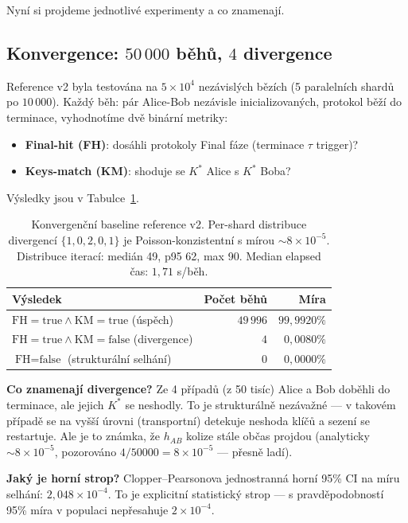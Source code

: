 \documentclass[11pt,a4paper]{article}
\begin{document}
Nyní si projdeme jednotlivé experimenty a co znamenají.

\subsection{Konvergence: $50\,000$ běhů, $4$ divergence}\label{pop:exp-convergence}

Reference v2 byla testována na $5 \times 10^4$ nezávislých bězích (5 paralelních shardů po $10\,000$). Každý běh: pár Alice-Bob nezávisle inicializovaných, protokol běží do terminace, vyhodnotíme dvě binární metriky:
\begin{itemize}[leftmargin=*]
\item \textbf{Final-hit (FH)}: dosáhli protokoly Final fáze (terminace $\tau$ trigger)?
\item \textbf{Keys-match (KM)}: shoduje se $K^*$ Alice s $K^*$ Boba?
\end{itemize}

Výsledky jsou v Tabulce~\ref{tab:pop-convergence}.

\begin{table}[ht]
\centering
\small
\begin{tabular}{lrr}
\toprule
Výsledek & Počet běhů & Míra \\
\midrule
$\text{FH}=\text{true} \land \text{KM}=\text{true}$ (úspěch) & $49\,996$ & $99{,}9920\%$ \\
$\text{FH}=\text{true} \land \text{KM}=\text{false}$ (divergence) & $4$ & $0{,}0080\%$ \\
$\text{FH}=\text{false}$ (strukturální selhání) & $0$ & $0{,}0000\%$ \\
\bottomrule
\end{tabular}
\caption{Konvergenční baseline reference v2. Per-shard distribuce divergencí $\{1, 0, 2, 0, 1\}$ je Poisson-konzistentní s mírou $\sim 8 \times 10^{-5}$. Distribuce iterací: medián 49, p95 62, max 90. Median elapsed čas: $1{,}71$ s/běh.}
\label{tab:pop-convergence}
\end{table}

\textbf{Co znamenají divergence?} Ze 4 případů (z 50 tisíc) Alice a Bob doběhli do terminace, ale jejich $K^*$ se neshodly. To je strukturálně nezávažné --- v takovém případě se na vyšší úrovni (transportní) detekuje neshoda klíčů a sezení se restartuje. Ale je to známka, že $h_{AB}$ kolize stále občas projdou (analyticky $\sim 8 \times 10^{-5}$, pozorováno $4/50000 = 8 \times 10^{-5}$ --- přesně ladí).

\textbf{Jaký je horní strop?} Clopper--Pearsonova jednostranná horní 95\% CI na míru selhání: $2{,}048 \times 10^{-4}$. To je explicitní statistický strop --- s pravděpodobností 95\% míra v populaci nepřesahuje $2 \times 10^{-4}$.
\end{document}
